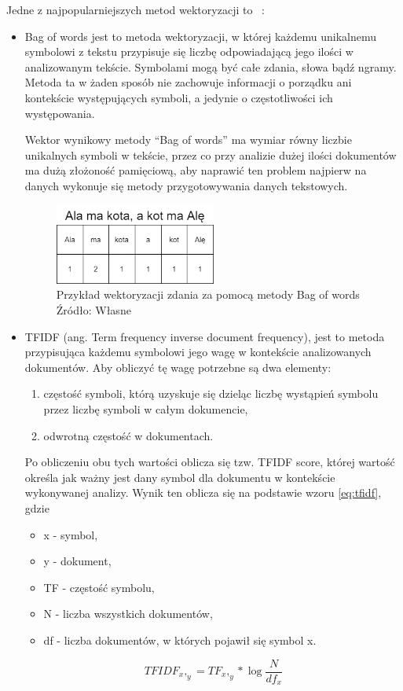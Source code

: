 Jedne z najpopularniejszych metod wektoryzacji to ~\cite{ML}: 
\begin{itemize}
    \item Bag of words jest to metoda wektoryzacji, w której każdemu unikalnemu symbolowi z tekstu przypisuje się liczbę 
    odpowiadającą jego ilości w analizowanym tekście. Symbolami mogą być całe zdania, słowa bądź ngramy. 
    Metoda ta w żaden sposób nie zachowuje informacji o porządku ani kontekście występujących symboli, a jedynie o 
    częstotliwości ich występowania. 
    
    Wektor wynikowy metody ``Bag of words'' ma wymiar równy liczbie unikalnych symboli w tekście, przez co przy analizie dużej ilości 
    dokumentów ma dużą złożoność pamięciową, aby naprawić ten problem najpierw na danych wykonuje się metody przygotowywania danych tekstowych.

    \begin{figure}[h]
        \centering
        \includegraphics[width=0.5\textwidth]{./Img/bowexample.png}
        \caption{Przykład wektoryzacji zdania za pomocą metody Bag of words Źródło: Własne}
    \end{figure}

    \item TFIDF (ang. Term frequency inverse document frequency), jest to metoda przypisująca każdemu symbolowi 
    jego wagę w kontekście analizowanych dokumentów. Aby obliczyć tę wagę potrzebne są dwa elementy:
    \begin{enumerate}
        \item częstość symboli, którą uzyskuje się dzieląc liczbę wystąpień symbolu przez liczbę symboli w całym dokumencie,
        \item odwrotną częstość w dokumentach.
    \end{enumerate}
    Po obliczeniu obu tych wartości oblicza się tzw. TFIDF score, której wartość określa jak ważny jest dany symbol 
    dla dokumentu w kontekście wykonywanej analizy. Wynik ten oblicza się na podstawie wzoru \ref{eq:tfidf}, gdzie
    \begin{itemize}
        \item x - symbol,
        \item y - dokument,
        \item TF - częstość symbolu,
        \item N - liczba wszystkich dokumentów,
        \item df - liczba dokumentów, w których pojawił się symbol x.
    \end{itemize}

    \begin{equation}
        \label{eq:tfidf}
        TFIDF_x,_y = TF_x,_y* \log{\frac{N}{df_x}}
    \end{equation}
\end{itemize}